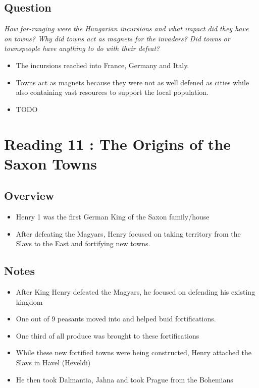 \documentclass[12pt]{article}
\begin{document}
\subsection*{Question}

\textit{How far-ranging were the Hungarian incursions and what impact did they have on towns? Why did towns act as magnets for the invaders? Did towns or townspeople have anything to do with their defeat?}

\begin{itemize}
	\item The incursions reached into France, Germany and Italy.
	\item Towns act as magnets because they were not as well defened as cities while also containing vast resources to support the local population.
	\item TODO

\end{itemize}


\section*{Reading 11 : The Origins of the Saxon Towns}

\subsection*{Overview}

\begin{itemize}
	\item Henry 1 was the first German King of the Saxon family/house
	\item After defeating the Magyars, Henry focused on taking territory from the Slavs to the East and fortifying new towns.
\end{itemize}

\subsection*{Notes}

\begin{itemize}
	\item After King Henry defeated the Magyars, he focused on defending his existing kingdom
	\item One out of 9 peasants moved into and helped buid fortifications. 
	\item One third of all produce was brought to these fortifications
	\item While these new fortified towns were being constructed, Henry attached the Slavs in Havel (Heveldi)
	\item He then took Dalmantia, Jahna and took Prague from the Bohemians
\end{itemize}
\end{document}
